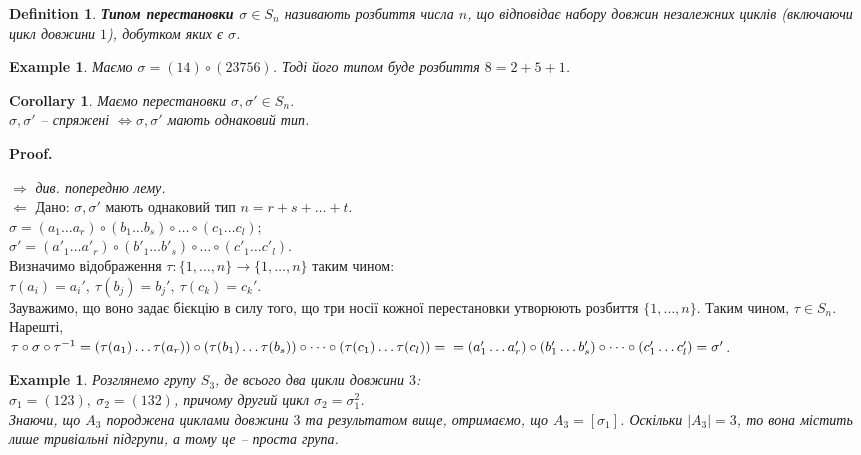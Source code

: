 \documentclass[a4paper, 10pt]{article}
\makeatletter
\def\rightproof{$\boxed{\Rightarrow}$ }
\def\leftproof{$\boxed{\Leftarrow}$ }
\theoremstyle{theoremdd}
\theoremstyle{theoremdd}
\newtheorem{definition}[theorem]{Definition}
\theoremstyle{theoremdd}
\theoremstyle{theoremdd}
\theoremstyle{theoremdd}
\newtheorem{example}[theorem]{Example}
\theoremstyle{theoremdd}
\theoremstyle{theoremdd}
\theoremstyle{theoremdd}
\theoremstyle{theoremdd}
\theoremstyle{theoremdd}
\theoremstyle{theoremdd}
\theoremstyle{theoremdd}
\theoremstyle{theoremdd}
\theoremstyle{theoremdd}
\newtheorem{corollary}[theorem]{Corollary}
\theoremstyle{theoremdd}
\renewenvironment{proof}[1][Proof.\\]{\par
\pushQED{\hfill \qed}%
\normalfont \topsep6\p@\@plus6\p@\relax
\trivlist
\item\relax
{\bfseries
#1\@addpunct{.}}\hspace\labelsep\ignorespaces
}{%
\popQED\endtrivlist\@endpefalse
}
\makeatother
\begin{document}
\begin{definition}
\textbf{Типом перестановки $\sigma \in S_n$} називають розбиття числа $n$, що відповідає набору довжин незалежних циклів (включаючи цикл довжини $1$), добутком яких є $\sigma$.
\end{definition}

\begin{example}
Маємо $\sigma = (14) \circ (23756)$. Тоді його типом буде розбиття $8 = 2 + 5 + 1$.
\end{example}

\begin{corollary}
Маємо перестановки $\sigma, \sigma' \in S_n$.\\
$\sigma, \sigma'$ -- спряжені $\iff \sigma, \sigma'$ мають однаковий тип.
\end{corollary}

\begin{proof}
\rightproof \textit{див. попередню лему.}
\bigskip \\
\leftproof Дано: $\sigma,\sigma'$ мають однаковий тип $n = r + s + \dots + t$.\\
$\sigma = (a_1 \dots a_r) \circ (b_1 \dots b_s) \circ \dots \circ (c_1 \dots c_l)$;\\
$\sigma' = (a'_1 \dots a'_r) \circ (b'_1 \dots b'_s) \circ \dots \circ (c'_1 \dots c'_l)$.\\
Визначимо відображення $\tau \colon \{1,\dots,n\} \to \{1,\dots,n\}$ таким чином:\\ $\tau(a_i) = a_i',\ \tau(b_j) = b_j',\ \tau(c_k) = c_k'$.\\
Зауважимо, що воно задає бієкцію в силу того, що три носії кожної перестановки утворюють розбиття $\{1,\dots,n\}$. Таким чином, $\tau \in S_n$. Нарешті,\\
$\tau \circ \sigma \circ \tau^{-1} = (\tau(a_1)\dots \tau(a_r)) \circ (\tau(b_1)\dots \tau(b_s)) \circ \dots \circ (\tau(c_1)\dots \tau(c_l)) = \\ 
=(a'_1 \dots a'_r) \circ (b'_1 \dots b'_s) \circ \dots \circ (c'_1 \dots c'_l) = \sigma'$.
\end{proof}

\begin{example}
Розглянемо групу $S_3$, де всього два цикли довжини $3$:\\
$\sigma_1 = (123),\ \sigma_2 = (132)$, причому другий цикл $\sigma_2 = \sigma_1^2$.\\
Знаючи, що $A_3$ породжена циклами довжини $3$ та результатом вище, отримаємо, що $A_3 = [\sigma_1]$. Оскільки $|A_3| = 3$, то вона містить лише тривіальні підгрупи, а тому це -- проста група.
\end{example}
\end{document}
